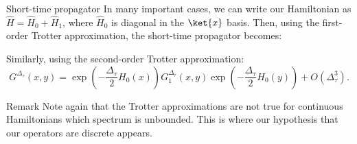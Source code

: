\documentclass[a4paper]{article}
\begin{document}
\begin{parag}{Short-time propagator}
    In many important cases, we can write our Hamiltonian as $\hat{H} = \hat{H}_0 + \hat{H}_1$, where $\hat{H}_0$ is diagonal in the $\ket{x}$ basis. Then, using the first-order Trotter approximation, the short-time propagator becomes:

    Similarly, using the second-order Trotter approximation:
    \[G^{\Delta_{\tau}}\left(x, y\right) = \exp\left(-\frac{\Delta_{\tau}}{2} H_0\left(x\right)\right) G_1^{\Delta_{\tau}}\left(x, y\right) \exp\left(-\frac{\Delta_{\tau}}{2} H_0\left(y\right)\right) + O\left(\Delta_{\tau}^3\right).\]

    \begin{subparag}{Remark}
        Note again that the Trotter approximations are not true for continuous Hamiltonians which spectrum is unbounded. This is where our hypothesis that our operators are discrete appears.
    \end{subparag}
\end{parag}
\end{document}
